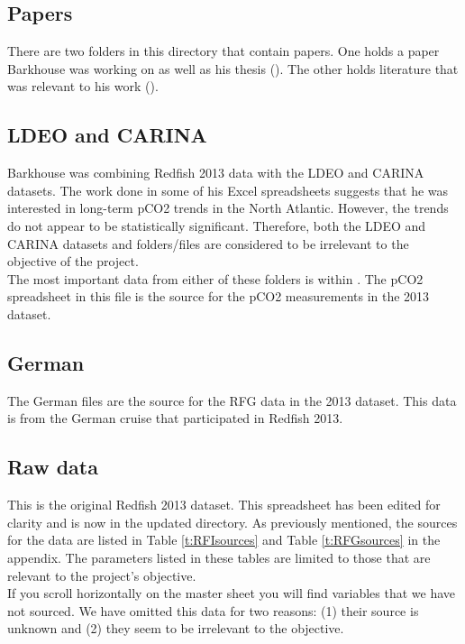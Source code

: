 \documentclass[journal, a4paper]{article} %
\begin{document}
\subsection{Papers}

There are two folders in this directory that contain papers. One holds a paper Barkhouse was working on as well as his thesis (). The other holds literature that was relevant to his work (). 

\subsection{LDEO and CARINA}
Barkhouse was combining Redfish 2013 data with the LDEO and CARINA datasets. The work done in some of his Excel spreadsheets suggests that he was interested in long-term pCO2 trends in the North Atlantic. However, the trends do not appear to be statistically significant. Therefore, both the LDEO and CARINA datasets and folders/files are considered to be irrelevant to the objective of the project. 
\\[12pt]
The most important data from either of these folders is within . The pCO2 spreadsheet in this file is the source for the pCO2 measurements in the 2013 dataset.  

\subsection{German}

The German files are the source for the RFG data in the 2013 dataset. This data is from the German cruise that participated in Redfish 2013. 

\subsection{Raw data}

This is the original Redfish 2013 dataset. This spreadsheet has been edited for clarity and is now in the updated directory. As previously mentioned, the sources for the data are listed in Table \ref{t:RFIsources} and Table \ref{t:RFGsources} in the appendix. The parameters listed in these tables are limited to those that are relevant to the project's objective. 
\\[12pt]
\noindent If you scroll horizontally on the master sheet you will find variables that we have not sourced. We have omitted this data for two reasons: (1) their source is unknown and (2) they seem to be irrelevant to the objective. 
\end{document}
